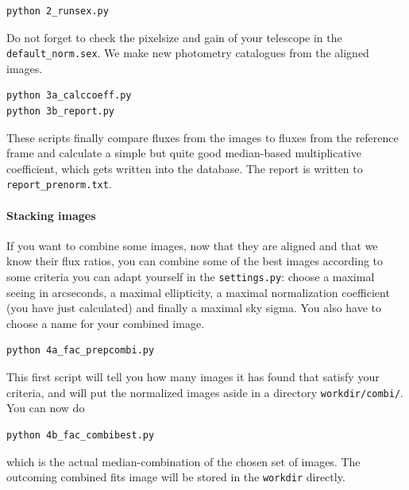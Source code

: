 \begin{Verbatim}
python 2_runsex.py
\end{Verbatim}
Do not forget to check the pixelsize and gain of your telescope in the \verb+default_norm.sex+. We make new photometry catalogues from the aligned images.

\begin{Verbatim}
python 3a_calccoeff.py
python 3b_report.py
\end{Verbatim}
These scripts finally compare fluxes from the images to fluxes from the reference frame and calculate a simple but quite good median-based multiplicative coefficient, which gets written into the database. The report is written to \verb+report_prenorm.txt+.


\paragraph{Stacking images}

If you want to combine some images, now that they are aligned and that we know their flux ratios, you can combine some of the best images according to some criteria you can adapt yourself in the \verb+settings.py+: choose a maximal seeing in arcseconds, a maximal ellipticity, a maximal normalization coefficient (you have just calculated) and finally a maximal sky sigma. You also have to choose a name for your combined image.

\begin{Verbatim}
python 4a_fac_prepcombi.py
\end{Verbatim}
This first script will tell you how many images it has found that satisfy your criteria, and will put the normalized images aside in a directory \verb+workdir/combi/+. You can now do

\begin{Verbatim}
python 4b_fac_combibest.py
\end{Verbatim}
which is the actual median-combination of the chosen set of images. The outcoming combined fits image will be stored in the \verb+workdir+ directly.

% 


